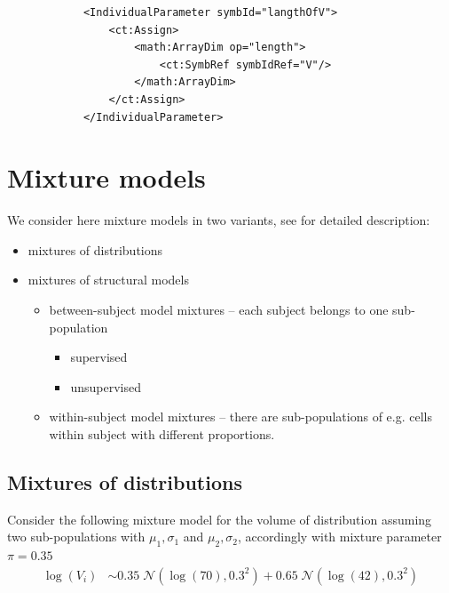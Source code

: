 \lstset{language=XML}
\begin{lstlisting}
            <IndividualParameter symbId="langthOfV">
                <ct:Assign>
                    <math:ArrayDim op="length">
                        <ct:SymbRef symbIdRef="V"/>
                    </math:ArrayDim>
                </ct:Assign>
            </IndividualParameter>
\end{lstlisting}

\section{Mixture models}
\label{sec:mixModels}
We consider here mixture models in two variants, see \cite{LavielleBook:2014}
for detailed description:
\begin{itemize}
\item 
mixtures of distributions
\item 
mixtures of structural models
\begin{itemize}
\item 
between-subject model mixtures -- each subject belongs to one sub-population 
\begin{itemize}
\item 
supervised
\item 
unsupervised
\end{itemize}
\item 
within-subject model mixtures -- there are sub-populations of e.g. cells within subject
with different proportions.
\end{itemize}
\end{itemize}


\subsection{Mixtures of distributions}
\label{sec:mixDistribs}

Consider the following mixture model for the volume of distribution assuming two
sub-populations with $\mu_1, \sigma_1$ and $\mu_2, \sigma_2$, accordingly
with mixture parameter $\pi=0.35$
\begin{align}
\log(V_i) &\sim 0.35 \;\mathcal{N}(\log(70),0.3^2) + 0.65 \;\mathcal{N}(\log(42),0.3^2)	\nonumber
\end{align}

